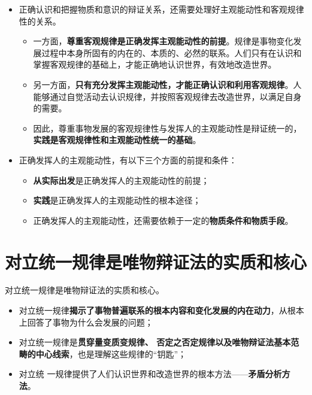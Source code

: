 \documentclass[
]{article}
\begin{document}
\begin{itemize}
\item
  正确认识和把握物质和意识的辩证关系，还需要处理好主观能动性和客观规律性的关系。

  \begin{itemize}
  \item
    一方面，\textbf{尊重客观规律是正确发挥主观能动性的前提}。规律是事物变化发展过程中本身所固有的内在的、本质的、必然的联系。人们只有在认识和掌握客观规律的基础上，才能正确地认识世界，有效地改造世界。
  \item
    另一方面，\textbf{只有充分发挥主观能动性，才能正确认识和利用客观规律}。人能够通过自觉活动去认识规律，并按照客观规律去改造世界，以满足自身的需要。
  \item
    因此，尊重事物发展的客观规律性与发挥人的主观能动性是辩证统一的，\textbf{实践是客观规律性和主观能动性统一的基础}。
  \end{itemize}
\item
  正确发挥人的主观能动性，有以下三个方面的前提和条件：

  \begin{itemize}
  \item
    \textbf{从实际出发}是正确发挥人的主观能动性的前提；
  \item
    \textbf{实践}是正确发挥人的主观能动性的根本途径；
  \item
    正确发挥人的主观能动性，还需要依赖于一定的\textbf{物质条件和物质手段}。
  \end{itemize}
\end{itemize}

\hypertarget{ux5bf9ux7acbux7edfux4e00ux89c4ux5f8bux662fux552fux7269ux8fa9ux8bc1ux6cd5ux7684ux5b9eux8d28ux548cux6838ux5fc3}{%
\section{对立统一规律是唯物辩证法的实质和核心}\label{ux5bf9ux7acbux7edfux4e00ux89c4ux5f8bux662fux552fux7269ux8fa9ux8bc1ux6cd5ux7684ux5b9eux8d28ux548cux6838ux5fc3}}

对立统一规律是唯物辩证法的实质和核心。

\begin{itemize}
\item
  对立统一规律\textbf{揭示了事物普遍联系的根本内容和变化发展的内在动力}，从根本上回答了事物为什么会发展的问题；
\item
  对立统一规律是\textbf{贯穿量变质变规律、
  否定之否定规律以及唯物辩证法基本范畴的中心线索}，也是理解这些规律的``钥匙''；
\item
  对立统
  一规律提供了人们认识世界和改造世界的根本方法------\textbf{矛盾分析方法}。
\end{itemize}
\end{document}
